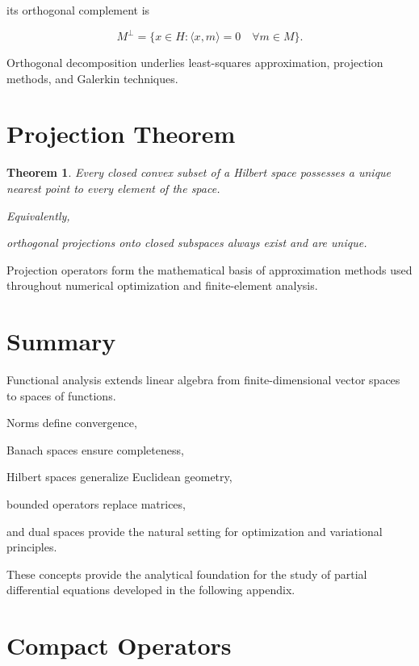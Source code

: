 \documentclass[11pt,fleqn]{book}
\numberwithin{equation}{chapter}
\theoremstyle{plain}
\newtheorem{theorem}{Theorem}[chapter]
\theoremstyle{definition}
\theoremstyle{remark}
\begin{document}
its orthogonal complement is

\[
\boxed{
M^\perp
=
\{
x\in H
:
\langle x,m\rangle=0
\quad
\forall m\in M
\}.
}
\]

Orthogonal decomposition underlies least-squares approximation,
projection methods, and Galerkin techniques.


\section{Projection Theorem}

\begin{theorem}

Every closed convex subset of a Hilbert space possesses a unique nearest
point to every element of the space.

Equivalently,

orthogonal projections onto closed subspaces always exist and are
unique.

\end{theorem}

Projection operators form the mathematical basis of approximation
methods used throughout numerical optimization and finite-element
analysis.


\section{Summary}

Functional analysis extends linear algebra from finite-dimensional
vector spaces to spaces of functions.

Norms define convergence,

Banach spaces ensure completeness,

Hilbert spaces generalize Euclidean geometry,

bounded operators replace matrices,

and dual spaces provide the natural setting for optimization and
variational principles.

These concepts provide the analytical foundation for the study of
partial differential equations developed in the following appendix.


\section{Compact Operators}
\end{document}
